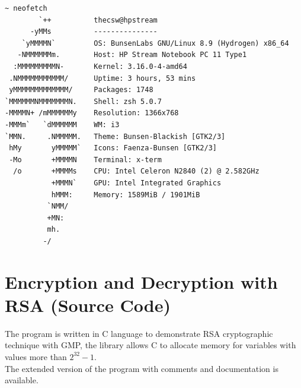 \documentclass[a4paper, 12pt]{article}
\begin{document}
\begin{lstlisting}[caption=System Specifications]
  ~ neofetch
        `++          thecsw@hpstream
      -yMMs          ---------------
    `yMMMMN`         OS: BunsenLabs GNU/Linux 8.9 (Hydrogen) x86_64
   -NMMMMMMm.        Host: HP Stream Notebook PC 11 Type1 
  :MMMMMMMMMN-       Kernel: 3.16.0-4-amd64
 .NMMMMMMMMMMM/      Uptime: 3 hours, 53 mins
 yMMMMMMMMMMMMM/     Packages: 1748
`MMMMMMNMMMMMMMN.    Shell: zsh 5.0.7
-MMMMN+ /mMMMMMMy    Resolution: 1366x768
-MMMm`   `dMMMMMM    WM: i3
`MMN.     .NMMMMM.   Theme: Bunsen-Blackish [GTK2/3]
 hMy       yMMMMM`   Icons: Faenza-Bunsen [GTK2/3]
 -Mo       +MMMMN    Terminal: x-term
  /o       +MMMMs    CPU: Intel Celeron N2840 (2) @ 2.582GHz
           +MMMN`    GPU: Intel Integrated Graphics
           hMMM:     Memory: 1589MiB / 1901MiB
          `NMM/ 
          +MN:                               
          mh. 
         -/ 

  \end{lstlisting}

\newpage 

\section{Encryption and Decryption with RSA (Source Code)}
\label{big}
The program is written in C\cite{Clang} language to demonstrate RSA cryptographic technique
with GMP\cite{gmp}, the library allows C to allocate memory for variables with values more than $2 ^{32} − 1$.\\

The extended version of the program with comments and documentation is available\cite{github}.
\end{document}
